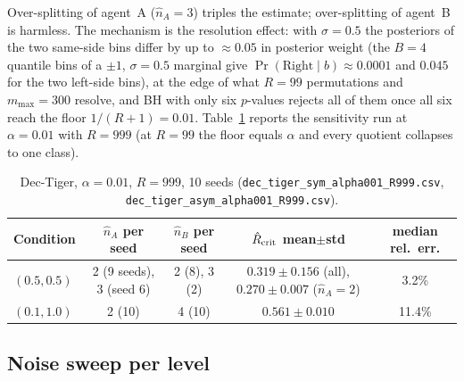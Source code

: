 \documentclass[10pt]{article}
\begin{document}
Over-splitting of agent~A ($\hat n_A=3$) triples the estimate; over-splitting of
agent~B is harmless.  The mechanism is the resolution effect: with
$\sigma=0.5$ the posteriors of the two same-side bins differ by up to
$\approx0.05$ in posterior weight (the $B{=}4$ quantile bins of a $\pm1$, $\sigma{=}0.5$ marginal give $\Pr(\text{Right}\mid b)\approx0.0001$ and $0.045$ for the two left-side bins), at the edge of what $R=99$ permutations and
$m_{\max}=300$ resolve, and BH with only six $p$-values rejects all of them
once all six reach the floor $1/(R+1)=0.01$.  Table~\ref{tab:rcrit-alpha001}
reports the sensitivity run at $\alpha=0.01$ with $R=999$ (at $R=99$ the floor
equals $\alpha$ and every quotient collapses to one class).

\begin{table}[h]
\centering
\small
\caption{Dec-Tiger, $\alpha=0.01$, $R=999$, 10 seeds
  (\texttt{dec\_tiger\_sym\_alpha001\_R999.csv},
  \texttt{dec\_tiger\_asym\_alpha001\_R999.csv}).}
\label{tab:rcrit-alpha001}
\begin{tabular}{lcccc}
\toprule
Condition & $\hat n_A$ per seed & $\hat n_B$ per seed & $\hat R_{\rm crit}$ mean$\pm$std & median rel.\ err. \\
\midrule
$(0.5,0.5)$ & 2 (9 seeds), 3 (seed 6) & 2 (8), 3 (2) & $0.319\pm0.156$ (all), $0.270\pm0.007$ ($\hat n_A{=}2$) & 3.2\% \\
$(0.1,1.0)$ & 2 (10) & 4 (10) & $0.561\pm0.010$ & 11.4\% \\
\bottomrule
\end{tabular}
\end{table}

\subsection{Noise sweep per level}
\end{document}
